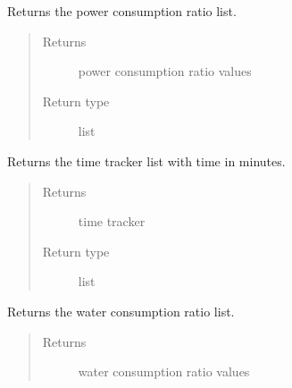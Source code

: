 \documentclass[letterpaper,10pt,english]{sphinxmanual}
\begin{document}
\begin{fulllineitems}
\begin{fulllineitems}
\label{\detokenize{apidoc:dreaminsg_integrated_model.src.resilience_metrics.WeightedResilienceMetric.get_power_consump_tracker}}
\sphinxAtStartPar
Returns the power consumption ratio list.
\begin{quote}\begin{description}
\item[{Returns}] \leavevmode
\sphinxAtStartPar
power consumption ratio values

\item[{Return type}] \leavevmode
\sphinxAtStartPar
list

\end{description}\end{quote}

\end{fulllineitems}


\begin{fulllineitems}
\label{\detokenize{apidoc:dreaminsg_integrated_model.src.resilience_metrics.WeightedResilienceMetric.get_time_tracker}}
\sphinxAtStartPar
Returns the time tracker list with time in minutes.
\begin{quote}\begin{description}
\item[{Returns}] \leavevmode
\sphinxAtStartPar
time tracker

\item[{Return type}] \leavevmode
\sphinxAtStartPar
list

\end{description}\end{quote}

\end{fulllineitems}


\begin{fulllineitems}
\label{\detokenize{apidoc:dreaminsg_integrated_model.src.resilience_metrics.WeightedResilienceMetric.get_water_consump_tracker}}
\sphinxAtStartPar
Returns the water consumption ratio list.
\begin{quote}\begin{description}
\item[{Returns}] \leavevmode
\sphinxAtStartPar
water consumption ratio values


\end{description}
\end{quote}
\end{fulllineitems}
\end{fulllineitems}
\end{document}
